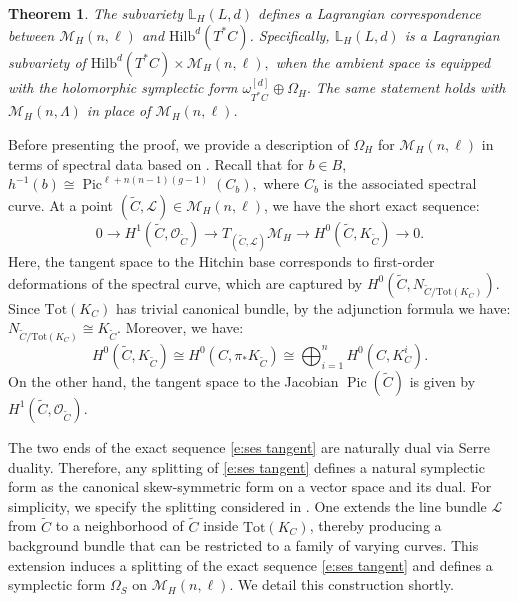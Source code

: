 \documentclass[twoside, 11pt]{article}
\numberwithin{equation}{section}
\theoremstyle{theorem}
\newtheorem{theorem}{Theorem}
\numberwithin{theorem}{section}
\theoremstyle{definition}
\begin{document}
\begin{theorem}\label{thm: Lag corres Higgs}
The subvariety $\mathbb{L}_H(L,d)$ defines a
\emph{Lagrangian correspondence} between
\(
\mathcal{M}_{H}(n, \ell)
\)
and
\(
\mathrm{Hilb}^d(T^*C)
\).
Specifically, $\mathbb{L}_H(L,d)$ is a Lagrangian subvariety of
\(
\mathrm{Hilb}^d(T^*C)\times \mathcal{M}_{H}(n, \ell),
\)
when the ambient space is equipped with the holomorphic symplectic form
\(
\omega_{T^\ast C}^{[d]} \oplus \Omega_H.
\)
The same statement holds with $\mathcal M_H(n,\Lambda)$ in place of $\mathcal M_H(n,\ell)$.
\end{theorem}


Before presenting the proof, we provide a description of $\Omega_H$ for $\mathcal{M}_{H}(n, \ell)$ in terms of spectral data based on \cite{Hur96}. 
Recall that for $b \in B$, 
$
h^{-1}(b) \cong \operatorname{Pic}^{\ell + n(n-1)(g-1)}(C_b),
$
where $C_b$ is the associated spectral curve. At a point $(\widetilde{C}, \mathcal{L}) \in \mathcal{M}_{H}(n, \ell)$, we have the short exact sequence:
\begin{equation} \label{e:ses tangent}
  0 \longrightarrow H^1(\widetilde{C}, \mathcal{O}_{\widetilde{C}}) \longrightarrow {T_{ (\widetilde{C}, \mathcal{L})}\mathcal{M}_{H}} \longrightarrow H^0(\widetilde{C}, K_{\widetilde{C}}) \longrightarrow 0.
\end{equation}
Here, the tangent space to the Hitchin base corresponds to first-order deformations of the spectral curve, which are captured by $H^0(\widetilde{C}, N_{\widetilde{C}/\mathrm{Tot}(K_C)})$. Since $\mathrm{Tot}(K_C)$ has trivial canonical bundle, by the adjunction formula we have:
$
N_{\widetilde{C}/\mathrm{Tot}(K_C)} \cong K_{\widetilde{C}}.
$
Moreover, we have:
$$
H^0(\widetilde{C}, K_{\widetilde{C}}) \cong H^0(C, \pi_* K_{\widetilde{C}}) \cong \bigoplus_{i=1}^n H^0(C, K_C^i).
$$
On the other hand, the tangent space to the Jacobian $\operatorname{Pic}(\widetilde{C})$ is given by $H^1(\widetilde{C}, \mathcal{O}_{\widetilde{C}})$.

The two ends of the exact sequence \eqref{e:ses tangent} are naturally dual via Serre duality. Therefore, any splitting of \eqref{e:ses tangent} defines a natural symplectic form as the canonical skew-symmetric form on a vector space and its dual. For simplicity, we specify the  splitting considered in \cite{Hur96}. 
One extends the line bundle $\mathcal{L}$ from $\widetilde{C}$ to a neighborhood of $\widetilde{C}$ inside $\mathrm{Tot}(K_C)$, thereby producing a background bundle that can be restricted to a family of varying curves. This extension induces a splitting of the exact sequence \eqref{e:ses tangent} and defines a symplectic form $\Omega_S$ on $\mathcal{M}_{H}(n, \ell)$. We detail this construction shortly.
\end{document}

